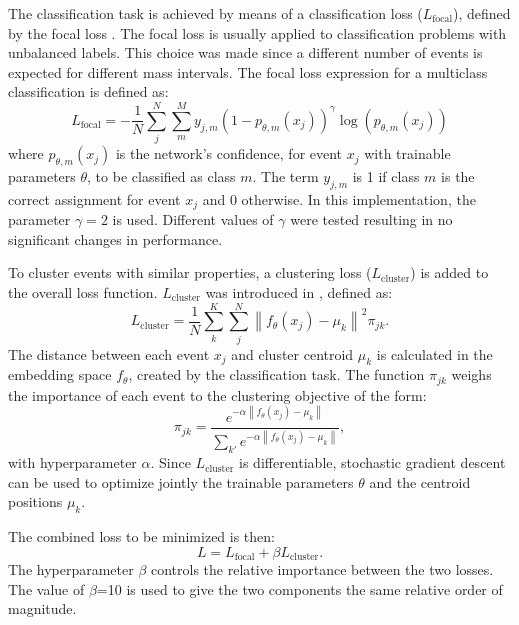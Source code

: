\documentclass[a4paper,11pt]{article}
\begin{document}
The classification task is achieved by means of a classification loss ($L_{\mathrm{focal}}$), defined by the focal loss \cite{DBLP:journals/corr/abs-1708-02002}. The focal loss is usually applied to classification problems with unbalanced labels. This choice was made since a different number of events is expected for different mass intervals. The focal loss expression for a multiclass classification is defined as:
\begin{equation}
    L_{\mathrm{focal}}=  -\frac{1}{N}\sum_j^N \sum_m^M  y_{j,m} (1 - p_{\theta,m}(x_j))^{\gamma}\log(p_{\theta,m}(x_j))
    \label{eq:class_loss}
\end{equation}
where $p_{\theta,m}(x_j)$ is the network’s confidence, for event $x_j$ with trainable parameters $\theta$, to be classified as class $m$. The term $y_{j,m}$ is 1 if class $m$ is the correct assignment for event $x_j$ and 0 otherwise.
In this implementation, the parameter $\gamma=2$ is used. Different values of $\gamma$ were tested resulting in no significant changes in performance.

To cluster events with similar properties, a clustering loss ($L_{\mathrm{cluster}}$) is added to the overall loss function. $L_{\mathrm{cluster}}$ was introduced in \cite{DBLP:journals/corr/abs-1806-10069}, defined as:
\begin{equation}
    L_{\mathrm{cluster}} = \frac{1}{N}\sum_k ^K \sum_j^N \left \| f_{\theta}(x_j) - \mu_k \right \|^{2}\pi_{jk}.
    \label{eq:cluster_loss}
\end{equation}
The distance between each event $x_j$ and cluster centroid $\mu_k$ is calculated in the embedding space $f_{\theta}$, created by the classification task. 
The function $\pi_{jk}$ weighs the importance of each event to the clustering objective of the form:
\begin{equation}
    \pi_{jk} = \frac{e^{-\alpha \left \| f_{\theta}(x_j) - \mu_k \right \|}}{\sum_{k'} e^{-\alpha \left \| f_{\theta}(x_j) - \mu_k \right \|}},
    \label{eq:pi}
\end{equation}
with hyperparameter $\alpha$. Since $L_{\mathrm{cluster}}$ is differentiable, stochastic gradient descent can be used to optimize jointly the trainable parameters $\theta$ and the centroid positions $\mu_k$. 

The combined loss to be minimized is then:
\begin{equation}
    L =  L_{\mathrm{focal}} + \beta L_{\mathrm{cluster}}.
    \label{eq:loss}
\end{equation}
The hyperparameter $\beta$ controls the relative importance between the two losses.
The value of $\beta$=10 is used to give the two components the same relative order of magnitude.
\end{document}
